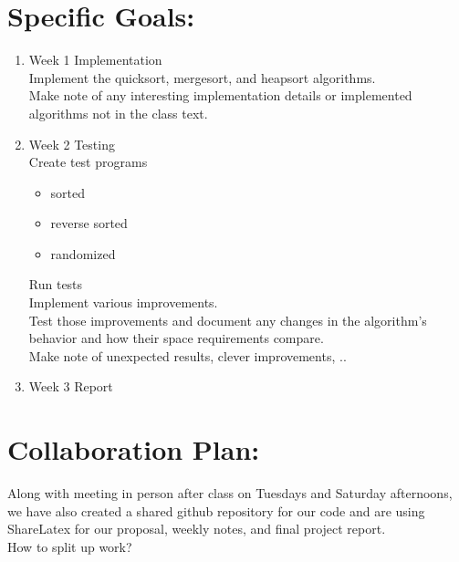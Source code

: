 \documentclass{article}
\begin{document}
\section*{Specific Goals:} 
\begin{enumerate}
\item Week 1  Implementation\\
Implement the quicksort, mergesort, and heapsort algorithms.\\
Make note of any interesting implementation details or implemented algorithms not in the class text.
\item Week 2  Testing \\
Create test programs
\begin{itemize}
\item sorted
\item reverse sorted
\item randomized
\end{itemize}
Run tests\\
Implement various improvements.\\
Test those improvements and document any changes in the algorithm's behavior and how their space requirements compare.\\
Make note of unexpected results, clever improvements, .. 
\item Week 3  Report \\
\end{enumerate}
\section*{Collaboration Plan: }
Along with meeting in person after class on Tuesdays and Saturday afternoons, we have also created a shared github repository for our code and are using ShareLatex for our proposal, weekly notes, and final project report.\\
How to split up work?
\end{document}
